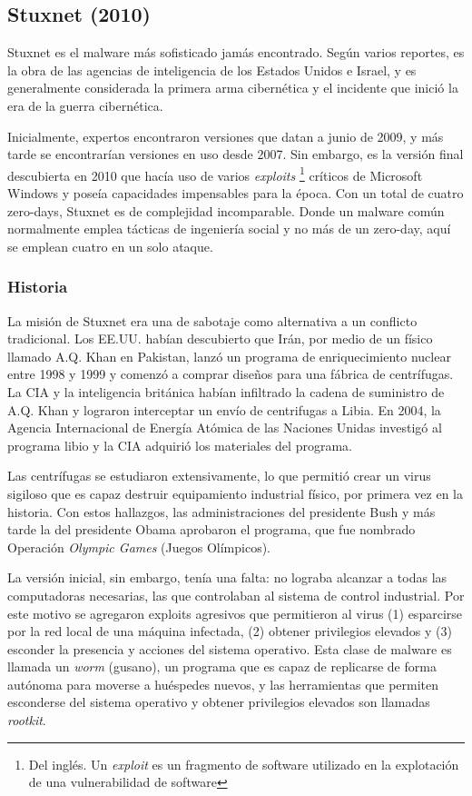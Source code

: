 \documentclass{article}
\begin{document}
\subsection{Stuxnet (2010)}
Stuxnet es el malware más sofisticado jamás encontrado. Según varios reportes, es la obra de las agencias de inteligencia de los Estados Unidos e Israel, y es generalmente considerada la primera arma cibernética y el incidente que inició la era de la guerra cibernética.

Inicialmente, expertos encontraron versiones que datan a junio de 2009, y más tarde se encontrarían versiones en uso desde 2007. Sin embargo, es la versión final descubierta en 2010 que hacía uso de varios {\it exploits} \footnote{Del inglés. Un {\it exploit} es un fragmento de software utilizado en la explotación de una vulnerabilidad de software} críticos de Microsoft Windows y poseía capacidades impensables para la época. Con un total de cuatro zero-days, Stuxnet es de complejidad incomparable. Donde un malware común normalmente emplea tácticas de ingeniería social y no más de un zero-day, aquí se emplean cuatro en un solo ataque. \autocite{symantec-stuxnet} \autocite{reuters-stuxnet}

\subsubsection{Historia}
La misión de Stuxnet era una de sabotaje como alternativa a un conflicto tradicional. Los EE.UU. habían descubierto que Irán, por medio de un físico llamado A.Q. Khan en Pakistan, lanzó un programa de enriquecimiento nuclear entre 1998 y 1999 y comenzó a comprar diseños para una fábrica de centrífugas. La CIA y la inteligencia británica habían infiltrado la cadena de suministro de A.Q. Khan y lograron interceptar un envío de centrifugas a Libia. En 2004, la Agencia Internacional de Energía Atómica de las Naciones Unidas investigó al programa libio y la CIA adquirió los materiales del programa.

Las centrífugas se estudiaron extensivamente, lo que permitió crear un virus sigiloso que es capaz destruir equipamiento industrial físico, por primera vez en la historia. Con estos hallazgos, las administraciones del presidente Bush y más tarde la del presidente Obama aprobaron el programa, que fue nombrado Operación {\it Olympic Games} (Juegos Olímpicos).

La versión inicial, sin embargo, tenía una falta: no lograba alcanzar a todas las computadoras necesarias, las que controlaban al sistema de control industrial. Por este motivo se agregaron exploits agresivos que permitieron al virus (1) esparcirse por la red local de una máquina infectada, (2) obtener privilegios elevados y (3) esconder la presencia y acciones del sistema operativo. Esta clase de malware es llamada un {\it worm} (gusano), un programa que es capaz de replicarse de forma autónoma para moverse a huéspedes nuevos, y las herramientas que permiten esconderse del sistema operativo y obtener privilegios elevados son llamadas {\it rootkit}.
\end{document}
